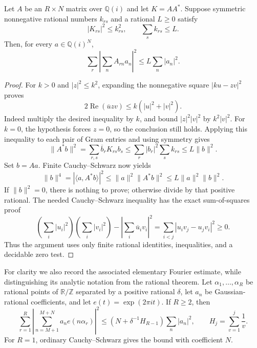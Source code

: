 \begin{proposition}
Let $A$ be an $R\times N$ matrix over $\mathbb Q(i)$ and let
$K=AA^*$. Suppose symmetric nonnegative rational numbers $k_{rs}$
and a rational $L\geq0$ satisfy
\[
 |K_{rs}|^2\leq k_{rs}^2,\qquad \sum_s k_{rs}\leq L.
\]
Then, for every $a\in\mathbb Q(i)^N$,
\[
 \sum_r\left|\sum_n A_{rn}a_n\right|^2
       \leq L\sum_n|a_n|^2.
\]
\end{proposition}
\begin{proof}
For $k>0$ and $|z|^2\leq k^2$, expanding the nonnegative square
$|ku-zv|^2$ proves
\[
 2\operatorname{Re}(\overline u zv)
       \leq k(|u|^2+|v|^2).
\]
Indeed multiply the desired inequality by $k$, and bound
$|z|^2|v|^2$ by $k^2|v|^2$. For $k=0$, the hypothesis forces $z=0$,
so the conclusion still holds. Applying this inequality to each pair
of Gram entries and using symmetry gives
\[
 \|A^*b\|^2
   =\sum_{r,s}\overline b_rK_{rs}b_s
   \leq\sum_r|b_r|^2\sum_s k_{rs}
   \leq L\|b\|^2.
\]
Set $b=Aa$. Finite Cauchy--Schwarz now yields
\[
 \|b\|^4=|\langle a,A^*b\rangle|^2
       \leq\|a\|^2\|A^*b\|^2
       \leq L\|a\|^2\|b\|^2.
\]
If $\|b\|^2=0$, there is nothing to prove; otherwise divide by that
positive rational. The needed Cauchy--Schwarz inequality has the exact
sum-of-squares proof
\[
 \left(\sum_i|u_i|^2\right)\left(\sum_i|v_i|^2\right)
  -\left|\sum_i\overline u_i v_i\right|^2
   =\sum_{i<j}|u_iv_j-u_jv_i|^2\geq0.
\]
Thus the argument uses only finite rational identities, inequalities,
and a decidable zero test.
\end{proof}

For clarity we also record the associated elementary Fourier estimate,
while distinguishing its analytic notation from the rational theorem.
Let $\alpha_1,\ldots,\alpha_R$ be rational points of
$\mathbb R/\mathbb Z$ separated by a positive rational $\delta$, let
$a_n$ be Gaussian-rational coefficients, and let $e(t)=\exp(2\pi it)$.
If $R\geq2$, then
\begin{equation}
 \sum_{r=1}^R\left|
  \sum_{n=M+1}^{M+N}a_ne(n\alpha_r)\right|^2
 \leq\left(N+\delta^{-1}H_{R-1}\right)\sum_n|a_n|^2,
 \qquad H_j=\sum_{v=1}^j\frac1v.
 \label{eq:large-sieve-harmonic}
\end{equation}
For $R=1$, ordinary Cauchy--Schwarz gives the bound with coefficient $N$.

